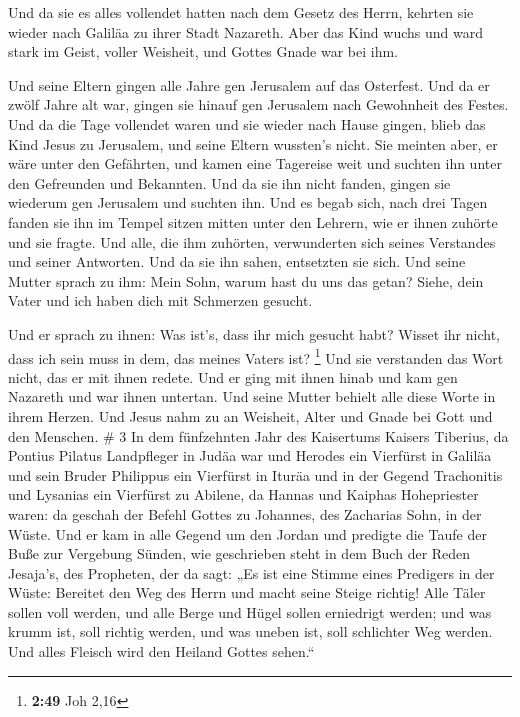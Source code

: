  Und da sie es alles vollendet hatten nach dem Gesetz des
Herrn, kehrten sie wieder nach Galiläa zu ihrer Stadt Nazareth.
 Aber das Kind wuchs und ward stark im Geist, voller
Weisheit, und Gottes Gnade war bei ihm.

 Und seine Eltern gingen alle Jahre gen Jerusalem auf das
Osterfest.  Und da er zwölf Jahre alt war, gingen sie
hinauf gen Jerusalem nach Gewohnheit des Festes.  Und da
die Tage vollendet waren und sie wieder nach Hause gingen, blieb das
Kind Jesus zu Jerusalem, und seine Eltern wussten's nicht. 
Sie meinten aber, er wäre unter den Gefährten, und kamen eine Tagereise
weit und suchten ihn unter den Gefreunden und Bekannten. 
Und da sie ihn nicht fanden, gingen sie wiederum gen Jerusalem und
suchten ihn.  Und es begab sich, nach drei Tagen fanden sie
ihn im Tempel sitzen mitten unter den Lehrern, wie er ihnen zuhörte und
sie fragte.  Und alle, die ihm zuhörten, verwunderten sich
seines Verstandes und seiner Antworten.  Und da sie ihn
sahen, entsetzten sie sich. Und seine Mutter sprach zu ihm: Mein Sohn,
warum hast du uns das getan? Siehe, dein Vater und ich haben dich mit
Schmerzen gesucht.

 Und er sprach zu ihnen: Was ist's, dass ihr mich gesucht
habt? Wisset ihr nicht, dass ich sein muss in dem, das meines Vaters
ist? \footnote{\textbf{2:49} Joh 2,16}  Und sie verstanden
das Wort nicht, das er mit ihnen redete.  Und er ging mit
ihnen hinab und kam gen Nazareth und war ihnen untertan. Und seine
Mutter behielt alle diese Worte in ihrem Herzen.  Und Jesus
nahm zu an Weisheit, Alter und Gnade bei Gott und den Menschen. \# 3
 In dem fünfzehnten Jahr des Kaisertums Kaisers Tiberius, da
Pontius Pilatus Landpfleger in Judäa war und Herodes ein Vierfürst in
Galiläa und sein Bruder Philippus ein Vierfürst in Ituräa und in der
Gegend Trachonitis und Lysanias ein Vierfürst zu Abilene, 
da Hannas und Kaiphas Hohepriester waren: da geschah der Befehl Gottes
zu Johannes, des Zacharias Sohn, in der Wüste.  Und er kam
in alle Gegend um den Jordan und predigte die Taufe der Buße zur
Vergebung Sünden,  wie geschrieben steht in dem Buch der
Reden Jesaja's, des Propheten, der da sagt: „Es ist eine Stimme eines
Predigers in der Wüste: Bereitet den Weg des Herrn und macht seine
Steige richtig!  Alle Täler sollen voll werden, und alle
Berge und Hügel sollen erniedrigt werden; und was krumm ist, soll
richtig werden, und was uneben ist, soll schlichter Weg werden.
 Und alles Fleisch wird den Heiland Gottes sehen.``

